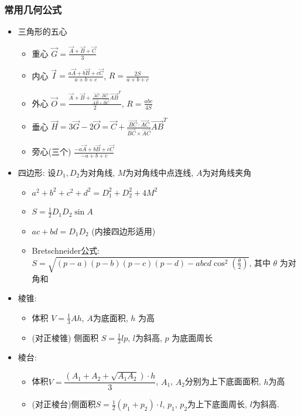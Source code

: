 \documentclass[landscape, twocolumn, 8pt, a4paper, twoside]{extarticle}
\begin{document}
    \subsubsection{常用几何公式}
    \begin{itemize}
    \item 三角形的五心
      \begin{itemize}
      \item 重心 $\vec{G} = \frac{\vec{A} + \vec{B} + \vec{C}}{3}$
      \item
        内心 $\vec{I} = \frac{a\vec{A} + b\vec{B} + c\vec{C}}{a + b + c}$,
        $R = \frac{2S}{a + b + c}$
      \item
        外心 $\vec{O} = \frac{\vec{A} + \vec{B} + \frac{\vec{AC} \cdot \vec{BC}}{\vec{AB} \times \vec{BC}} \vec{AB}^{T}}{2}$,
        $R = \frac{abc}{4S}$
      \item
        垂心 $\vec{H} = 3\vec{G} - 2\vec{O} = \vec{C} + \frac{\vec{BC} \cdot \vec{AC}}{\vec{BC} \times \vec{AC}} \vec{AB} ^ {T}$
      \item
        旁心(三个) $\frac{-a\vec{A} + b\vec{B} + c\vec{C}}{-a + b + c}$
      \end{itemize}

    \item 四边形: 设$D_1, D_2$为对角线, $M$为对角线中点连线, $A$为对角线夹角
      \begin{itemize}
      \item $a^2 + b^2 + c^2 + d^2 = D_1^2 + D_2 ^ 2 + 4 M^2$
      \item $S = \frac{1}{2} D_1  D_2 \sin A$
      \item $ac + bd = D_1 D_2$ (内接四边形适用)
      \item Bretschneider公式:
        $S = \sqrt{(p - a)(p - b)(p - c)(p - d) - abcd \cos^2(\frac{\theta}{2})}$, 其中 $\theta$ 为对角和
      \end{itemize}
    \item 棱锥:
      \begin{itemize}
      \item 体积 $V = \frac{1}{3}Ah$, $A$为底面积, $h$ 为高
      \item (对正棱锥) 侧面积 $S = \frac{1}{2} lp $, $l$为斜高, $p$ 为底面周长
      \end{itemize}
    \item 棱台:
      \begin{itemize}
      \item 体积$V = \dfrac{(A_1 + A_2 + \sqrt{A_1 A_2}) \cdot h}{3}$, $A_1$, $A_2$分别为上下底面面积, $h$为高
      \item (对正棱台)侧面积$S = \frac{1}{2} (p_1 + p_2) \cdot l$, $p_1$, $p_2$为上下底面周长, $l$为斜高. 
      \end{itemize}
    \end{itemize}
\end{document}
